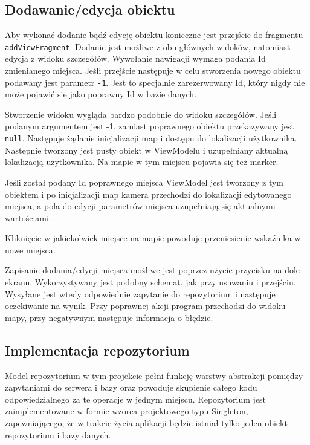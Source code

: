 \documentclass[polish,polish,a4paper,12pt]{article}
\begin{document}
	\subsection{Dodawanie/edycja obiektu}

	Aby wykonać dodanie bądź edycję obiektu konieczne jest przejście do fragmentu \texttt{addViewFragment}. Dodanie jest możliwe z obu głównych widoków, natomiast edycja z widoku szczegółów. Wywołanie nawigacji wymaga podania Id zmienianego miejsca. Jeśli przejście następuje w celu stworzenia nowego obiektu podawany jest parametr \texttt{-1}. Jest to specjalnie zarezerwowany Id, który nigdy nie może pojawić się jako poprawny Id w bazie danych.

	Stworzenie widoku wygląda bardzo podobnie do widoku szczegółów. Jeśli podanym argumentem jest -1, zamiast poprawnego obiektu przekazywany jest \texttt{null}. Następuje żądanie inicjalizacji map i dostępu do lokalizacji użytkownika. Następnie tworzony jest pusty obiekt w ViewModelu i uzupełniany aktualną lokalizacją użytkownika. Na mapie w tym miejscu pojawia się też marker.

	Jeśli został podany Id poprawnego miejsca ViewModel jest tworzony z tym obiektem i po inicjalizacji map kamera przechodzi do lokalizacji edytowanego miejsca, a pola do edycji parametrów miejsca uzupełniają się aktualnymi wartościami.

	Kliknięcie w jakiekolwiek miejsce na mapie powoduje przeniesienie wskaźnika w nowe miejsca.

	Zapisanie dodania/edycji miejsca możliwe jest poprzez użycie przycisku na dole ekranu. Wykorzystywany jest podobny schemat, jak przy usuwaniu i przejściu. Wysyłane jest wtedy odpowiednie zapytanie do repozytorium i następuje oczekiwanie na wynik. Przy poprawnej akcji program przechodzi do widoku mapy, przy negatywnym następuje informacja o błędzie.

	\subsection{Implementacja repozytorium}

	Model repozytorium w tym projekcie pełni funkcję warstwy abstrakcji pomiędzy zapytaniami do serwera i bazy oraz powoduje skupienie całego kodu odpowiedzialnego za te operacje w jednym miejscu. Repozytorium jest zaimplementowane w formie wzorca projektowego typu Singleton, zapewniającego, że w trakcie życia aplikacji będzie istniał tylko jeden obiekt repozytorium i bazy danych.
\end{document}
